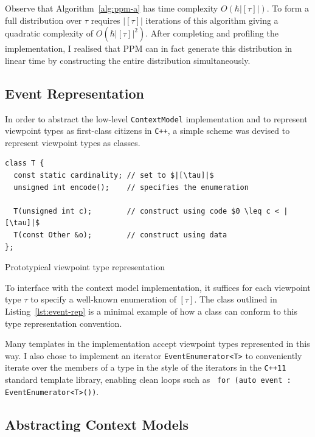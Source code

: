 \documentclass[12pt,a4paper,twoside,openright]{report}
\newcommand{\cppi}[1]{{\small \texttt{#1}}}
\begin{document}
Observe that Algorithm~\ref{alg:ppm-a} has time complexity $O(\hbar|[\tau]|)$.
To form a full distribution over $\tau$ requires $|[\tau]|$ iterations of this
algorithm giving a quadratic complexity of $O(\hbar|[\tau]|^2)$. After
completing and profiling the implementation, I realised that PPM can in fact
generate this distribution in linear time by constructing the entire
distribution simultaneously.

\subsection{Event Representation}\label{sec:cpp-event-rep}

In order to abstract the low-level \texttt{ContextModel} implementation and to
represent viewpoint types as first-class citizens in \texttt{C++}, a simple
scheme was devised to represent viewpoint types as classes.

\begin{listing}[H]
  \begin{verbatim}
class T {
  const static cardinality; // set to $|[\tau]|$
  unsigned int encode();    // specifies the enumeration

  T(unsigned int c);        // construct using code $0 \leq c < |[\tau]|$
  T(const Other &o);        // construct using data 
};
  \end{verbatim}
  \caption{Prototypical viewpoint type representation}
  \label{lst:event-rep}
\end{listing}

To interface with the context model implementation, it suffices for each
viewpoint type $\tau$ to specify a well-known enumeration of $[\tau]$. The class
outlined in Listing~\ref{lst:event-rep} is a minimal example of how a class can
conform to this type representation convention.

Many templates in the implementation accept viewpoint types represented in this
way. I also chose to implement an iterator \texttt{EventEnumerator<T>} to
conveniently iterate over the members of a type in the style of the iterators in
the \texttt{C++11} standard template library, enabling clean loops such as~
\cppi{for (auto event : EventEnumerator<T>())}.

\subsection{Abstracting Context Models}
\end{document}
